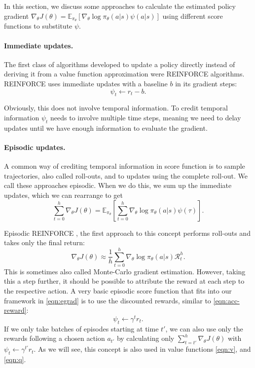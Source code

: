 In this section, we discuss some approaches to calculate the estimated policy gradient $\nabla_\theta J(\theta) = \mathbb{E}_{\pi_\theta}\left[\nabla_\theta{\log\pi_\theta(a|s)}\psi(a|s)\right]$ using different score functions to substitute $\psi$.

\paragraph{Immediate updates.} 
The first class of algorithms developed to update a policy directly instead of deriving it from a value function approximation were REINFORCE \cite{Williams92simplestatistical} algorithms.
REINFORCE uses immediate updates with a baseline $b$ in its gradient steps:
\begin{equation}
  \psi_t \leftarrow r_t-b.
\end{equation}

Obviously, this does not involve temporal information. 
To credit temporal information $\psi_t$ needs to involve multiple time steps, meaning we need to delay updates until we have enough information to evaluate the gradient.

\paragraph{Episodic updates.} 
A common way of crediting temporal information in score function is to sample trajectories, also called roll-outs, and to updates using the complete roll-out. 
We call these approaches episodic. 
When we do this, we sum up the immediate updates, which we can rearrange to get
\begin{equation}
  \sum_{t=0}^h \nabla_\theta J(\theta) = \mathbb{E}_{\pi_\theta}\left[\sum_{t=0}^h \nabla_\theta{\log\pi_\theta(a|s)}\psi(\tau)\right].
  \label{eqn:egrad}
\end{equation}

Episodic REINFORCE \cite{Williams92simplestatistical}, the first approach to this concept performs roll-outs and takes only the final return:
\begin{equation}
  \nabla_\theta J(\theta) \approx \frac{1}{h} \sum_{t=0}^h \nabla_\theta\log\pi_\theta(a|s) \mathcal{R}_t^h.
\end{equation}
This is sometimes also called Monte-Carlo gradient estimation. 
However, taking this a step further, it should be possible to attribute the reward at each step to the respective action. 
A very basic episodic score function that fits into our framework in \eqref{eqn:egrad} is to use the discounted rewards, similar to \eqref{eqn:acc-reward}:
\begin{equation}
  \psi_t \leftarrow \gamma^t r_t.
\end{equation}
If we only take batches of episodes starting at time $t'$, we can also use only the rewards following a chosen action $a_{t'}$ by calculating only $\sum_{t=t'}^h \nabla_\theta J(\theta)$ with $\psi_t \leftarrow \gamma^{t'} r_{t}$. 
As we will see, this concept is also used in value functions \eqref{eqn:v}, and \eqref{eqn:q}.

